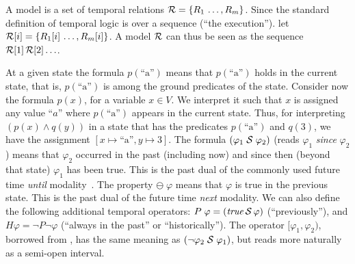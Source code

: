 A model is a set of temporal
 relations ${\cal R} = \{ R_1 \, \ldots , R_m \}$.
 Since the standard definition of temporal logic is
 over a sequence (``the execution''). let
 ${\cal R} [ i ] = \{ R_1 [ i ] \, \ldots , R_m [ i ] \}$. A model ${\cal R}$ can thus be
seen as the sequence ${\cal R} [ 1 ]\, {\cal R} [ 2 ] \ldots$.


\iffalse
At a given state the formula
$p(\text{``a''})$ means that $p (\text{``a''} )$ holds
in the current state,
that is, $p (\text{``a''} )$ is among 
the ground predicates of the state.
Consider now the formula $p ( x )$, for a variable $x \in V$.
We interpret it such that $x$ is assigned any value ``$a$'' where
$p ( \text{``a''} )$ appears in the current state. 
Thus, for interpreting $(p ( x ) \wedge q ( y ))$ in a state that
has the predicates
$p ( \text{``a''} )$ and $q ( 3 )$,
we have the assignment $[ x \mapsto \text{``a''} , y \mapsto 3 ]$.
The formula $(\varphi_1\; {\cal S}\; \varphi_2)$ 
(reads $\varphi_1$ {\em since} $\varphi_2$)
means that $\varphi_2$ occurred in the past (including now)
and since then (beyond that state) $\varphi_1$ has been true. This is the 
past dual of the commonly used %
future time  {\em until} modality~\cite{MP}. 
The property $\ominus \; \varphi$ means that $\varphi$ is true 
in the previous state.
This is the past dual of the %
future time {\em next} modality.
We can also define the following additional temporal operators:
$P \; \varphi = (\mathit{true} \, {\cal S} \, \varphi)$ (``previously''),
and $H \varphi = \neg P \neg \varphi$ (``always in the past'' or ``historically'').
The operator $[\varphi_1,\varphi_2)$, borrowed from \cite{MaC}, 
has the same meaning as $(\neg \varphi_2\; {\cal S}\; \varphi_1)$, but reads more naturally as
a semi-open interval. 



